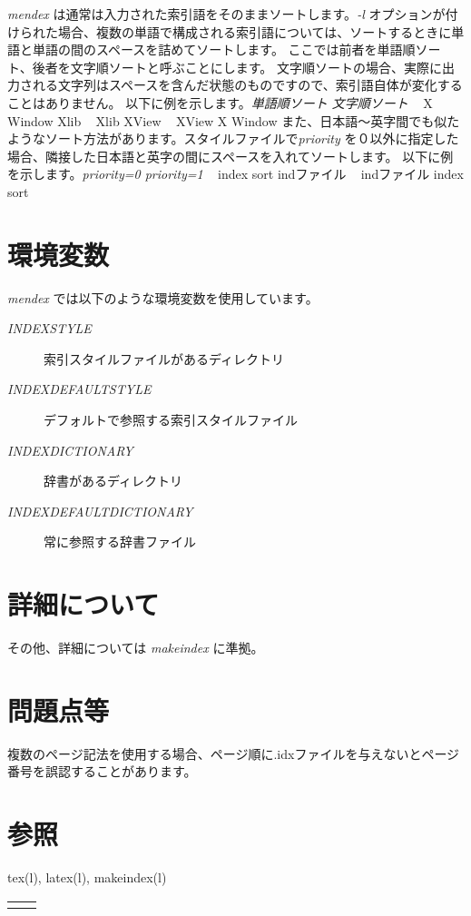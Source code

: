 \documentclass[10pt,dvipdfmx]{jsarticle}
\begin{document}
\emph{mendex}
 は通常は入力された索引語をそのままソートします。\emph{-l}
オプションが付けられた場合、複数の単語で構成される索引語については、ソートするときに単語と単語の間のスペースを詰めてソートします。 ここでは前者を単語順ソート、後者を文字順ソートと呼ぶことにします。 文字順ソートの場合、実際に出力される文字列はスペースを含んだ状態のものですので、索引語自体が変化することはありません。 以下に例を示します。\emph{単語順ソート 文字順ソート}
   X Window Xlib   Xlib XView   XView X Window また、日本語〜英字間でも似たようなソート方法があります。スタイルファイルで\emph{priority}
を０以外に指定した場合、隣接した日本語と英字の間にスペースを入れてソートします。 以下に例を示します。\emph{priority=0 priority=1}
   index sort indファイル   indファイル index sort\section*{環境変数}
\emph{mendex}
 では以下のような環境変数を使用しています。\begin{description}
\item[\emph{INDEXSTYLE}
] 索引スタイルファイルがあるディレクトリ

\end{description}
\begin{description}
\item[\emph{INDEXDEFAULTSTYLE}
] デフォルトで参照する索引スタイルファイル

\end{description}
\begin{description}
\item[\emph{INDEXDICTIONARY}
] 辞書があるディレクトリ

\end{description}
\begin{description}
\item[\emph{INDEXDEFAULTDICTIONARY}
] 常に参照する辞書ファイル

\end{description}
\section*{詳細について}
 その他、詳細については \emph{makeindex}
 に準拠。\section*{問題点等}
 複数のページ記法を使用する場合、ページ順に.idxファイルを与えないとページ番号を誤認することがあります。\section*{参照}
 tex(l), latex(l), makeindex(l)

\begin{tabular}{cc}
 &

\end{tabular}
\end{document}
